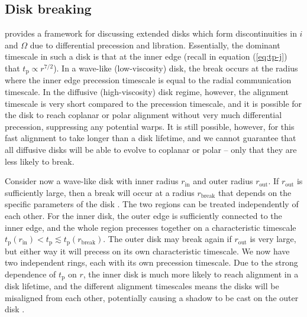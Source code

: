 \documentclass[twocolumn,linenumbers]{aastex631}
\newcommand{\RR}[1]{\textcolor{blue}{\bf#1}} %
\begin{document}
\subsection{Disk breaking}
\label{subsec:breaks}
\citet{rabago2024} provides a framework for discussing extended disks which form discontinuities in $i$ and $\Omega$ due to differential precession and libration. Essentially, the dominant timescale in such a disk is that at the inner edge (recall in equation (\ref{eq:tp-j}) that $t_\text{p} \propto r^{7/2}$).
In a wave-like (low-viscosity) disk, the break occurs at the radius where the inner edge precession timescale is equal to the radial communication timescale. In the diffusive (high-viscosity) disk regime, however, the alignment timescale is very short compared to the precession timescale, and it is possible for the disk to reach coplanar or polar alignment without very much differential precession, suppressing any potential warps. It is still possible, however, for this fast alignment to take longer than a disk lifetime, and we cannot guarantee that all diffusive disks will be able to evolve to coplanar or polar -- only that they are less likely to break.

Consider now a wave-like disk with inner radius $r_\text{in}$ and outer radius $r_\text{out}$. If $r_\text{out}$ is sufficiently large, then a break will occur at a radius $r_\text{break}$ that depends on the specific parameters of the disk \citep[see][eq. (9)]{rabago2024}. The two regions can be treated independently of each other. For the inner disk, the outer edge is sufficiently connected to the inner edge, and the whole region precesses together on a characteristic timescale $t_\text{p}(r_\text{in}) < t_\text{p} \lesssim t_\text{p}(r_\text{break})$. The outer disk may break again if $r_\text{out}$ is very large, but either way it will precess on its own characteristic timescale. We now have two independent rings, each with its own precession timescale. Due to the strong dependence of $t_\text{p}$ on $r$, the inner disk is much more likely to reach alignment in a disk lifetime, and the different alignment timescales means the disks will be misaligned from each other, potentially causing a shadow to be cast on the outer disk \RR{\citep[see][]{bohn2022,benisty2023,su2024,zhang2024,zhu2024}}.
\end{document}
